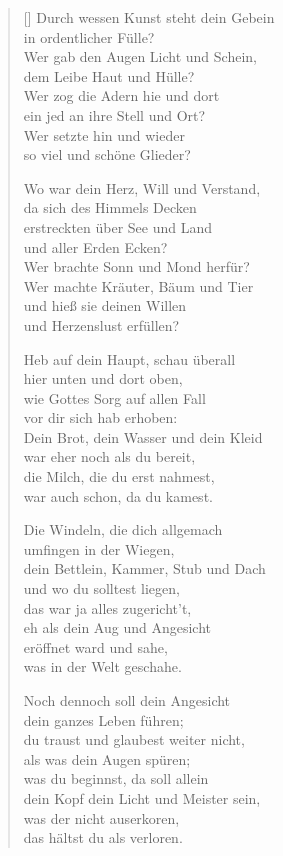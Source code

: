 \begin{multicols}{2}
\begin{verse}[\versewidth]
 Durch wessen Kunst steht dein Gebein\\
in ordentlicher Fülle?\\
Wer gab den Augen Licht und Schein,\\
dem Leibe Haut und Hülle?\\
Wer zog die Adern hie und dort\\
ein jed an ihre Stell und Ort?\\
Wer setzte hin und wieder\\
so viel und schöne Glieder?

 Wo war dein Herz, Will und Verstand,\\
da sich des Himmels Decken\\
erstreckten über See und Land\\
und aller Erden Ecken?\\
Wer brachte Sonn und Mond herfür?\\
Wer machte Kräuter, Bäum und Tier\\
und hieß sie deinen Willen\\
und Herzenslust erfüllen?

 Heb auf dein Haupt, schau überall\\
hier unten und dort oben,\\
wie Gottes Sorg auf allen Fall\\
vor dir sich hab erhoben:\\
Dein Brot, dein Wasser und dein Kleid\\
war eher noch als du bereit,\\
die Milch, die du erst nahmest,\\
war auch schon, da du kamest.

 Die Windeln, die dich allgemach\\
umfingen in der Wiegen,\\
dein Bettlein, Kammer, Stub und Dach\\
und wo du solltest liegen,\\
das war ja alles zugericht't,\\
eh als dein Aug und Angesicht\\
eröffnet ward und sahe,\\
was in der Welt geschahe.

 Noch dennoch soll dein Angesicht\\
dein ganzes Leben führen;\\
du traust und glaubest weiter nicht,\\
als was dein Augen spüren;\\
was du beginnst, da soll allein\\
dein Kopf dein Licht und Meister sein,\\
was der nicht auserkoren,\\
das hältst du als verloren.


\end{verse}
\end{multicols}
